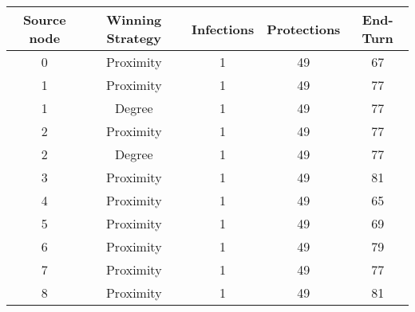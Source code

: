 \documentclass[results.tex]{subfiles}
\begin{document}
    \begin{center}
        \begin{tabular}{| c || c | c | c | c |}
            \hline
            {\bfseries Source node} & {\bfseries Winning Strategy} & {\bfseries Infections} & {\bfseries Protections}
            & {\bfseries End-Turn}
            \\  %
            \hline\hline
            0                       & Proximity                    & 1                      & 49                      & 67                   \\
            \hline
            1                       & Proximity                    & 1                      & 49                      & 77                   \\
            \hline
            1                       & Degree                       & 1                      & 49                      & 77                   \\
            \hline
            2                       & Proximity                    & 1                      & 49                      & 77                   \\
            \hline
            2                       & Degree                       & 1                      & 49                      & 77                   \\
            \hline
            3                       & Proximity                    & 1                      & 49                      & 81                   \\
            \hline
            4                       & Proximity                    & 1                      & 49                      & 65                   \\
            \hline
            5                       & Proximity                    & 1                      & 49                      & 69                   \\
            \hline
            6                       & Proximity                    & 1                      & 49                      & 79                   \\
            \hline
            7                       & Proximity                    & 1                      & 49                      & 77                   \\
            \hline
            8                       & Proximity                    & 1                      & 49                      & 81                   \\

\end{tabular}
\end{center}
\end{document}
